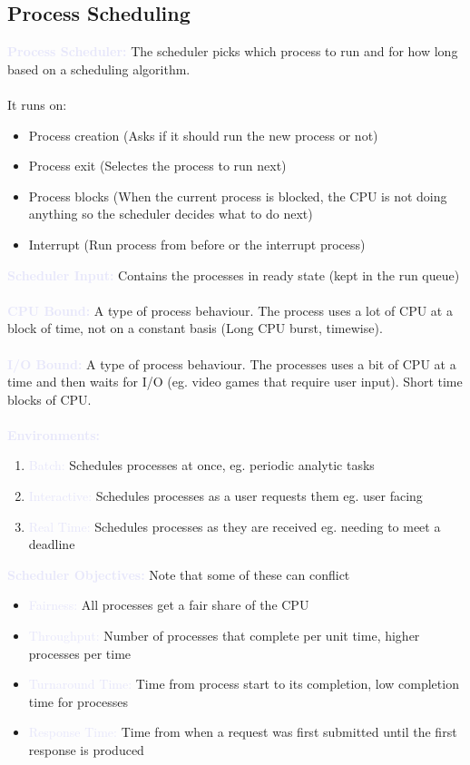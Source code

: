 \documentclass[a4paper,10pt]{article}
\begin{document}
\subsection{Process Scheduling}
\textcolor{Lavender}{\textbf{Process Scheduler:}} The scheduler picks which process to run and for how long based on a scheduling algorithm. \\\\
It runs on: 
\begin{itemize}
\item Process creation (Asks if it should run the new process or not)
\item Process exit (Selectes the process to run next)
\item Process blocks (When the current process is blocked, the CPU is not doing anything so the scheduler decides what to do next)
\item Interrupt (Run process from before or the interrupt process)
\end{itemize}
\textcolor{Lavender}{\textbf{Scheduler Input:}} Contains the processes in ready state (kept in the run queue) \\\\
\textcolor{Lavender}{\textbf{CPU Bound:}} A type of process behaviour. The process uses a lot of CPU at a block of time, not on a constant basis (Long CPU burst, timewise). \\\\
\textcolor{Lavender}{\textbf{I/O Bound:}} A type of process behaviour. The processes uses a bit of CPU at a time and then waits for I/O (eg. video games that require user input). Short time blocks of CPU. \\\\
\textcolor{Lavender}{\textbf{Environments:}}
\begin{enumerate}
\item \textcolor{Lavender}{Batch:} Schedules processes at once, eg. periodic analytic tasks
\item \textcolor{Lavender}{Interactive:} Schedules processes as a user requests them eg. user facing 
\item \textcolor{Lavender}{Real Time:} Schedules processes as they are received eg. needing to meet a deadline \\
\end{enumerate}
\textcolor{Lavender}{\textbf{Scheduler Objectives:}} Note that some of these can conflict 
\begin{itemize}
\item \textcolor{Lavender}{Fairness:} All processes get a fair share of the CPU
\item \textcolor{Lavender}{Throughput:} Number of processes that complete per unit time, higher processes per time 
\item \textcolor{Lavender}{Turnaround Time:} Time from process start to its completion, low completion time for processes
\item \textcolor{Lavender}{Response Time:} Time from when a request was first submitted until the first response is produced \\
\end{itemize}
\end{document}

